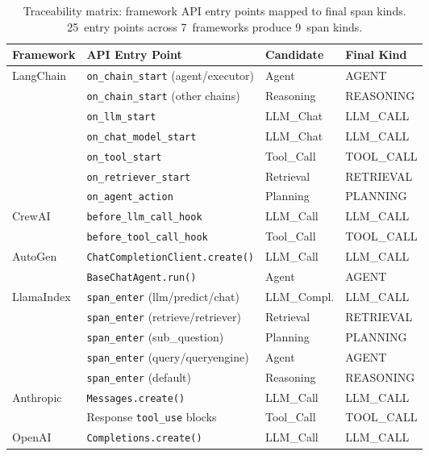 \documentclass[sigplan,10pt,screen]{acmart}
\begin{document}
\begin{table}[t]
\centering
\scriptsize
\caption{Traceability matrix: framework API entry points mapped to
final span kinds.  25~entry points across 7~frameworks produce
9~span kinds.}
\label{tab:traceability}
\begin{tabular}{@{}llll@{}}
\toprule
\textbf{Framework} & \textbf{API Entry Point} & \textbf{Candidate} & \textbf{Final Kind} \\
\midrule
\multirow{7}{*}{LangChain}
  & \texttt{on\_chain\_start} (agent/executor) & Agent & AGENT \\
  & \texttt{on\_chain\_start} (other chains) & Reasoning & REASONING \\
  & \texttt{on\_llm\_start} & LLM\_Chat & LLM\_CALL \\
  & \texttt{on\_chat\_model\_start} & LLM\_Chat & LLM\_CALL \\
  & \texttt{on\_tool\_start} & Tool\_Call & TOOL\_CALL \\
  & \texttt{on\_retriever\_start} & Retrieval & RETRIEVAL \\
  & \texttt{on\_agent\_action} & Planning & PLANNING \\
\midrule
\multirow{2}{*}{CrewAI}
  & \texttt{before\_llm\_call\_hook} & LLM\_Call & LLM\_CALL \\
  & \texttt{before\_tool\_call\_hook} & Tool\_Call & TOOL\_CALL \\
\midrule
\multirow{2}{*}{AutoGen}
  & \texttt{ChatCompletionClient.create()} & LLM\_Call & LLM\_CALL \\
  & \texttt{BaseChatAgent.run()} & Agent & AGENT \\
\midrule
\multirow{5}{*}{LlamaIndex}
  & \texttt{span\_enter} (llm/predict/chat) & LLM\_Compl. & LLM\_CALL \\
  & \texttt{span\_enter} (retrieve/retriever) & Retrieval & RETRIEVAL \\
  & \texttt{span\_enter} (sub\_question) & Planning & PLANNING \\
  & \texttt{span\_enter} (query/queryengine) & Agent & AGENT \\
  & \texttt{span\_enter} (default) & Reasoning & REASONING \\
\midrule
\multirow{2}{*}{Anthropic}
  & \texttt{Messages.create()} & LLM\_Call & LLM\_CALL \\
  & Response \texttt{tool\_use} blocks & Tool\_Call & TOOL\_CALL \\
\midrule
\multirow{2}{*}{OpenAI}
  & \texttt{Completions.create()} & LLM\_Call & LLM\_CALL \\

\end{tabular}
\end{table}
\end{document}

